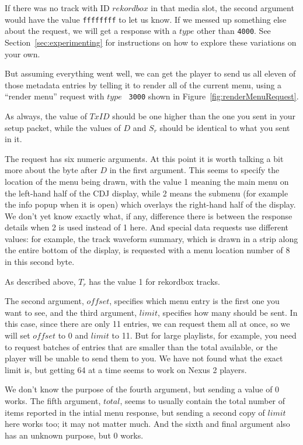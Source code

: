 \documentclass[11pt]{article}
\begin{document}
If there was no track with ID $rekordbox$ in that media slot, the
second argument would have the value {\tt ffffffff} to let us know. If
we messed up something else about the request, we will get a response
with a $type$ other than {\tt 4000}. See
Section~\ref{sec:experimenting} for instructions on how to explore
these variations on your own.

But assuming everything went well, we can get the player to send us
all eleven of those metadata entries by telling it to render all of
the current menu, using a ``render menu'' request with $type$ {\tt
  3000} shown in Figure~\ref{fig:renderMenuRequest}.

As always, the value of $TxID$ should be one higher than the one you
sent in your setup packet, while the values of $D$ and $S_r$ should be
identical to what you sent in it.

The request has six numeric arguments. At this point it is worth
talking a bit more about the byte after $D$ in the first argument.
This seems to specify the location of the menu being drawn, with the
value 1 meaning the main menu on the left-hand half of the CDJ
display, while 2 means the submenu (for example the info popup when it
is open) which overlays the right-hand half of the display. We don't
yet know exactly what, if any, difference there is between the
response details when 2 is used instead of 1 here. And special data
requests use different values: for example, the track waveform
summary, which is drawn in a strip along the entire bottom of the
display, is requested with a menu location number of 8 in this second
byte.

As described above, $T_r$ has the value 1 for rekordbox tracks.

The second argument, $offset$, specifies which menu entry is the first
one you want to see, and the third argument, $limit$, specifies how
many should be sent. In this case, since there are only 11 entries, we
can request them all at once, so we will set $offset$ to 0 and $limit$
to 11. But for large playlists, for example, you need to request
batches of entries that are smaller than the total available, or the
player will be unable to send them to you. We have not found what the
exact limit is, but getting 64 at a time seems to work on Nexus 2
players.

We don't know the purpose of the fourth argument, but sending a value
of 0 works. The fifth argument, $total$, seems to usually contain the
total number of items reported in the intial menu response, but
sending a second copy of $limit$ here works too; it may not matter
much. And the sixth and final argument also has an unknown purpose,
but 0 works.
\end{document}
